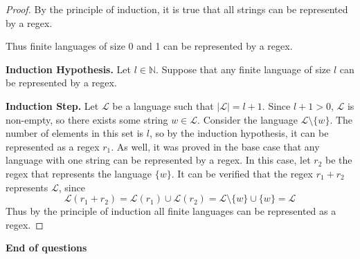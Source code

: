 \documentclass[11pt]{article}
\begin{document}
\begin{enumerate}[label=\textbf{Q\arabic*.}]
\begin{proof}
	By the principle of induction, it is true that all strings can be represented by a regex.

	Thus finite languages of size 0 and 1 can be represented by a regex.

	\textbf{Induction Hypothesis.} Let \(l \in \mathbb{N}\). Suppose that any finite language of size \(l\) can be represented by a regex.

	\textbf{Induction Step.} Let \(\mathcal{L}\) be a language such that \(|\mathcal{L}| = l + 1\). Since \(l+1 > 0\), \(\mathcal{L}\) is non-empty, so there exists some string \(w \in \mathcal{L}\). Consider the language \(\mathcal{L} \setminus \{w\}\). The number of elements in this set is \(l\), so by the induction hypothesis, it can be represented as a regex \(r_1\). As well, it was proved in the base case that any language with one string can be represented by a regex. In this case, let \(r_2\) be the regex that represents the language \(\{w\}\). It can be verified that the regex \(r_1 + r_2\) represents \(\mathcal{L}\), since
	\[
		\mathcal{L} (r_1 + r_2) = \mathcal{L} (r_1) \cup \mathcal{L} (r_2) = \mathcal{L} \setminus \{w\} \cup \{w\} = \mathcal{L}
	\]
	Thus by the principle of induction all finite languages can be represented as a regex.

\end{proof}


	\end{enumerate}

\vspace{1cm}

 \textbf{End of questions}
\end{document}
